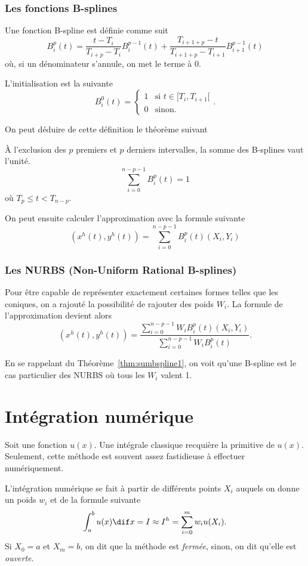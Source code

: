 \section{Les fonctions B-splines}
Une fonction B-spline est définie comme suit
\[ B_i^p(t) = \frac{t-T_i}{T_{i+p}-T_i} B_i^{p-1}(t)
+ \frac{T_{i+1+p} - t}{T_{i+1+p} - T_{i+1}}B_{i+1}^{p-1}(t) \]
où, si un dénominateur s'annule, on met le terme à 0.

L'initialisation est la suivante
\[ B_i^0(t) = \left\{\begin{array}{ll}
1 & \text{si }t \in [T_i, T_{i+1}[\\
0 & \text{sinon.}\end{array}\right.. \]

On peut déduire de cette définition le théorème suivant
\begin{mytheo}
  \label{thm:sumbspline1}
  À l'exclusion des $p$ premiers et $p$ derniers intervalles,
  la somme des B-splines vaut l'unité.
  \[ \sum_{i=0}^{n-p-1} B_i^p(t) = 1 \]
  où $T_p \leq t < T_{n-p}$.
\end{mytheo}

On peut ensuite calculer l'approximation avec la formule suivante
\[ (x^h(t), y^h(t)) = \sum_{i=0}^{n-p-1} B_i^p(t) (X_i, Y_i) \]

\section{Les NURBS (Non-Uniform Rational B-splines)}
Pour être capable de représenter exactement certaines formes telles
que les coniques, on a rajouté la possibilité de rajouter des poids $W_i$.
La formule de l'approximation devient alors
\[ (x^h(t), y^h(t)) =
\frac{\sum_{i=0}^{n-p-1}W_iB_i^p(t)(X_i, Y_i)}
{\sum_{i=0}^{n-p-1}W_iB_i^p(t)}. \]

En se rappelant du Théorème~\ref{thm:sumbspline1}, on voit
qu'une B-spline est le cas particulier des NURBS où tous les $W_i$ valent 1.

\part{Intégration numérique}
Soit une fonction $u(x)$.
Une intégrale classique recquière la primitive de $u(x)$.
Seulement, cette méthode est souvent assez fastidieuse à effectuer
numériquement.

L'intégration numérique se fait à partir de différents points $X_i$ auquels
on donne un poids $w_i$ et de la formule suivante
\[ \int_a^b u(x) \dif x = I \approx I^h = \sum_{i=0}^m w_i u(X_i). \]
Si $X_0 = a$ et $X_m = b$, on dit que la méthode est \emph{fermée},
sinon, on dit qu'elle est \emph{ouverte}.

